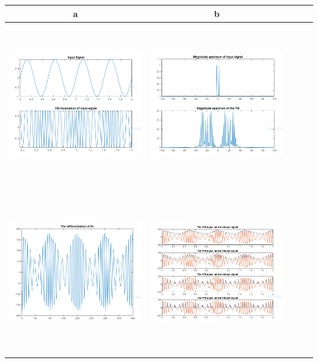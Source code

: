 \documentclass[12pt,a4paper]{article}%
\begin{document}
   \begin{tabular}{ccccc}
   	\toprule
   	a & b \\
   	\midrule
   	{\includegraphics[width=7cm,height=7cm]{./images/fmenv1.PNG}} & {\includegraphics[width=7cm,height=7cm]{./images/fmenv2.PNG}}  \\
   	{\includegraphics[width=7cm,height=7cm]{./images/fmenv3.PNG}} & {\includegraphics[width=7cm,height=7cm]{./images/fmenv4.PNG}}  \\
   \end{tabular}
    \pagebreak
\end{document}

